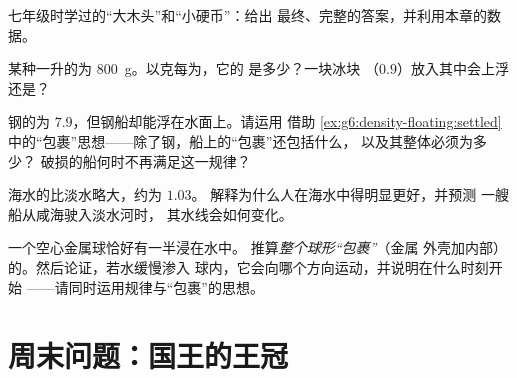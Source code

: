 \begin{exercise}[$\star$]\label{exo:g6:density-floating:8}
七年级时学过的“大木头”和“小硬币”：给出
最终、完整的答案，并利用本章的数据。
\end{exercise}

\begin{exercise}[$\star\star$]\label{exo:g6:density-floating:9}
某种一升的为 \qty{800}{g}。以克每为，它的
是多少？一块冰块
（$0.9$）放入其中会上浮还是？
\end{exercise}

\begin{exercise}[$\star\star$]\label{exo:g6:density-floating:10}
钢的为 $7.9$，但钢船却能浮在水面上。请运用
借助
\cref{ex:g6:density-floating:settled}中的“包裹”思想——除了钢，船上的“包裹”还包括什么，
以及其整体必须为多少？
破损的船何时不再满足这一规律？
\end{exercise}

\begin{exercise}[$\star\star$]\label{exo:g6:density-floating:11}
海水的比淡水略大，约为 $1.03$。
解释为什么人在海水中得明显更好，并预测
一艘船从咸海驶入淡水河时，
其水线会如何变化。
\end{exercise}

\begin{exercise}[$\star\star\star$]\label{exo:g6:density-floating:12}
一个空心金属球恰好有一半浸在水中。
推算\emph{整个球形“包裹”}（金属
外壳加内部）的。然后论证，若水缓慢渗入
球内，它会向哪个方向运动，并说明在什么时刻开始
——请同时运用规律与“包裹”的思想。
\end{exercise}

\section{周末问题：国王的王冠}

